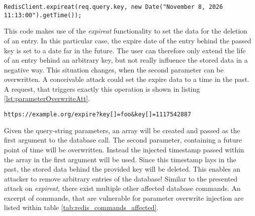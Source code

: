 \begin{lstlisting}[caption={Vulnerable NodeJS example for parameter overwrite injection against Redis}, label={lst:parameterOverwriteApp}]
RedisClient.expireat(req.query.key, new Date("November 8, 2026 11:13:00").getTime());
\end{lstlisting}

This code makes use of the \emph{expireat} functionality to set the data for the deletion of an entry. In this particular case, the expire date of the entry behind the passed key is set to a date far in the future. The user can therefore only extend the life of an entry behind an arbitrary key, but not really influence the stored data in a negative way. This situation changes, when the second parameter can be overwritten. A conceivable attack could set the expire data to a time in the past. A request, that triggers exactly this operation is shown in listing \ref{lst:parameterOverwriteAtt}. \\

\begin{lstlisting}[caption={Attack vector against Redis for query selector injection via the query-string parameter}, label={lst:parameterOverwriteAtt}]
https://example.org/expire?key[]=foo&key[]=1117542887
\end{lstlisting}

Given the query-string parameters, an array will be created and passed as the first argument to the database call. The second parameter, containing a future point of time will be overwritten. Instead the injected timestamp passed within the array in the first argument will be used. Since this timestamp lays in the past, the stored data behind the provided key will be deleted. This enables an attacker to remove arbitrary entries of the database! Similar to the presented attack on \emph{expireat}, there exist multiple other affected database commands. An excerpt of commands, that are vulnerable for parameter overwrite injection are listed within table \ref{tab:redis_commands_affected}. \\

